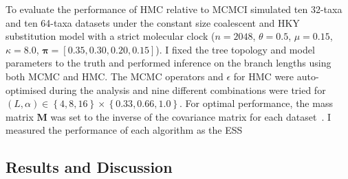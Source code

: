 \documentclass{article}
\renewcommand{\vec}[1]{\ensuremath{\boldsymbol{\mathbf{#1}}}}
\newcommand{\mat}[1]{\ensuremath{\boldsymbol{\mathbf{#1}}}}
\begin{document}
    To evaluate the performance of \ac{HMC} relative to \ac{MCMC}I simulated
        ten 32-taxa and ten 64-taxa datasets under the constant size coalescent
        and HKY substitution model with a strict molecular clock ($n = 2048$,
        $\theta = 0.5$, $\mu = 0.15$, $\kappa = 8.0$, $\vec{\pi} = \left[0.35,
        0.30, 0.20, 0.15\right]$).
    I fixed the tree topology and model parameters to the truth and performed
        inference on the branch lengths using both \ac{MCMC} and \ac{HMC}.
    The \ac{MCMC} operators and $\epsilon$ for \ac{HMC} were auto-optimised
        during the analysis and nine different combinations were tried for
        $\left(L, \alpha\right) \in \left\{4, 8, 16\right\} \times \left\{0.33, 0.66, 1.0\right\}$.
    For optimal performance, the mass matrix $\mat{M}$ was set to the inverse
        of the covariance matrix for each dataset~\cite{Nea11}.
    I measured the performance of each algorithm as the \ac{ESS}

    \singlespacing

    \subsection*{Results and Discussion}
\end{document}
